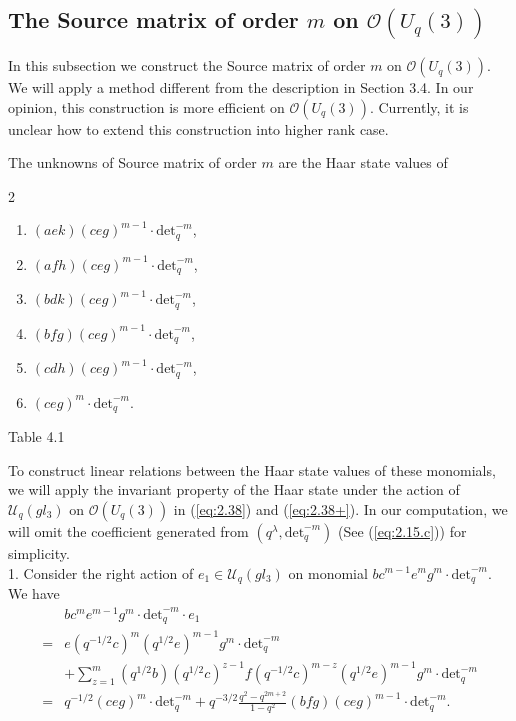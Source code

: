 \documentclass[table,a4paper,reqno]{amsart}
\numberwithin{equation}{section}
\theoremstyle{definition}
\begin{document}
\subsection{The Source matrix of order $m$ on $\mathcal{O}(U_q(3))$}
In this subsection we construct the Source matrix of order $m$ on $\mathcal{O}(U_q(3))$. We will apply a method different from the description in Section 3.4. In our opinion, this construction is more efficient on $\mathcal{O}(U_q(3))$. Currently, it is unclear how to extend this construction into higher rank case. 

The unknowns of Source matrix of order $m$ are the Haar state values of 
\begin{multicols}{2}
    \begin{enumerate}
        \item[1.] $(aek)(ceg)^{m-1}\cdot\text{det}_q^{-m}$,
        \item[2.] $(afh)(ceg)^{m-1}\cdot\text{det}_q^{-m}$,
        \item[3.] $(bdk)(ceg)^{m-1}\cdot\text{det}_q^{-m}$,
        \item[4.]  $(bfg)(ceg)^{m-1}\cdot\text{det}_q^{-m}$,
        \item[5.] $(cdh)(ceg)^{m-1}\cdot\text{det}_q^{-m}$,
        \item[6.] $(ceg)^{m}\cdot\text{det}_q^{-m}$.
    \end{enumerate}
\end{multicols}
\begin{center}
    Table 4.1
\end{center}
To construct linear relations between the Haar state values of these monomials, we will apply the invariant property of the Haar state under the action of $\mathcal{U}_q(gl_3)$ on $\mathcal{O}(U_q(3))$ in (\ref{eq:2.38}) and (\ref{eq:2.38+}). In our computation, we will omit the coefficient generated from $(q^{\lambda},\text{det}_q^{-m})$ (See (\ref{eq:2.15.c})) for simplicity.\\
1. Consider the right action of $e_1\in\mathcal{U}_q(gl_3)$ on monomial $bc^{m-1}e^{m}g^m\cdot\text{det}_q^{-m}$. We have
\begin{equation}\label{eq:4.6}
    \begin{split}
        &bc^{m}e^{m-1}g^m\cdot\text{det}_q^{-m}\cdot e_1\\
        =&e(q^{-1/2}c)^{m}(q^{1/2}e)^{m-1}g^m\cdot\text{det}_q^{-m}\\
        &+\sum_{z=1}^{m}(q^{1/2}b)(q^{1/2}c)^{z-1}f(q^{-1/2}c)^{m-z}(q^{1/2}e)^{m-1}g^m\cdot\text{det}_q^{-m}\\
        =&q^{-1/2}(ceg)^m\cdot\text{det}_q^{-m}+q^{-3/2}\frac{q^2-q^{2m+2}}{1-q^2}(bfg)(ceg)^{m-1}\cdot\text{det}_q^{-m}.
    \end{split}
\end{equation}
\end{document}
